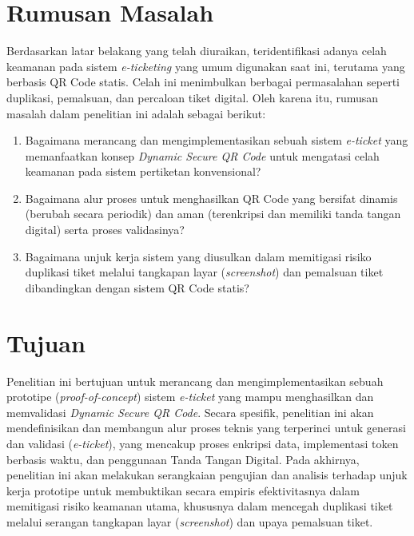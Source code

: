 \section{Rumusan Masalah}
Berdasarkan latar belakang yang telah diuraikan, teridentifikasi adanya celah keamanan pada sistem \textit{e-ticketing} yang umum digunakan saat ini, terutama yang berbasis QR Code statis. Celah ini menimbulkan berbagai permasalahan seperti duplikasi, pemalsuan, dan percaloan tiket digital. Oleh karena itu, rumusan masalah dalam penelitian ini adalah sebagai berikut:
\begin{enumerate}
\item	Bagaimana merancang dan mengimplementasikan sebuah sistem \textit{e-ticket} yang memanfaatkan konsep \textit{Dynamic Secure QR Code} untuk mengatasi celah keamanan pada sistem pertiketan konvensional?
\item	Bagaimana alur proses untuk menghasilkan QR Code yang bersifat dinamis (berubah secara periodik) dan aman (terenkripsi dan memiliki tanda tangan digital) serta proses validasinya?
\item	Bagaimana unjuk kerja sistem yang diusulkan dalam memitigasi risiko duplikasi tiket melalui tangkapan layar (\textit{screenshot}) dan pemalsuan tiket dibandingkan dengan sistem QR Code statis?
\end{enumerate}

\section{Tujuan}
Penelitian ini bertujuan untuk merancang dan mengimplementasikan sebuah prototipe (\textit{proof-of-concept}) sistem \textit{e-ticket} yang mampu menghasilkan dan memvalidasi \textit{Dynamic Secure QR Code}. Secara spesifik, penelitian ini akan mendefinisikan dan membangun alur proses teknis yang terperinci untuk generasi dan validasi (\textit{e-ticket}), yang mencakup proses enkripsi data, implementasi token berbasis waktu, dan penggunaan Tanda Tangan Digital. Pada akhirnya, penelitian ini akan melakukan serangkaian pengujian dan analisis terhadap unjuk kerja prototipe untuk membuktikan secara empiris efektivitasnya dalam memitigasi risiko keamanan utama, khususnya dalam mencegah duplikasi tiket melalui serangan tangkapan layar (\textit{screenshot}) dan upaya pemalsuan tiket.

